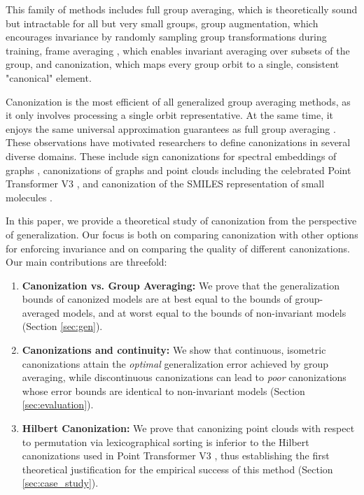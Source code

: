 \documentclass{article}
\begin{document}
This family of methods includes full group averaging, which is theoretically sound but intractable for all but very small groups, group augmentation, which encourages invariance by randomly sampling group transformations during training, frame averaging \cite{punyframe}, which enables invariant averaging over subsets of the group, and canonization, which maps every group orbit to a single, consistent "canonical" element.
 

Canonization is the most efficient of all generalized group averaging methods, as it only involves processing a single orbit representative. At the same time, it enjoys the same universal approximation guarantees as full group averaging \cite{kaba2023equivariance}. These observations have motivated researchers to define canonizations in several diverse domains. These include sign canonizations for spectral embeddings of graphs \cite{ma2023laplacian,ma2024a,hordan2025spectral}, canonizations of graphs \cite{lin2024equivariance} and point clouds \cite{kaba2023equivariance,pmlr-v235-baker24a,friedmann2025,zhou2026rethinkingdiffusionmodelssymmetries} including the celebrated Point Transformer V3 \cite{wu2024ptv3}, and canonization of the SMILES representation of small molecules \cite{canonicalSMILES}.



In this paper, we provide a theoretical study of canonization from the perspective of generalization. Our focus is both on comparing canonization with other options for enforcing invariance and on comparing the quality of different canonizations. Our main  contributions are threefold:

\begin{enumerate}
\item \textbf{Canonization vs. Group Averaging:} We prove that the generalization bounds of canonized models are at best equal to the bounds of group-averaged models, and at worst equal to the bounds of non-invariant models (Section \ref{sec:gen}).

\item \textbf{Canonizations and continuity:} We show that continuous, isometric canonizations attain the \emph{optimal} generalization error achieved by group averaging, while discontinuous canonizations can lead to \emph{poor} canonizations whose error bounds are identical to non-invariant models (Section \ref{sec:evaluation}).

\item \textbf{Hilbert Canonization:} We prove that 
canonizing point clouds with respect to permutation via lexicographical sorting is inferior to the  Hilbert canonizations used in  Point Transformer V3 \cite{wu2024ptv3}, thus establishing the first theoretical justification for the empirical success of this method (Section \ref{sec:case_study}).
\end{enumerate}
\end{document}
